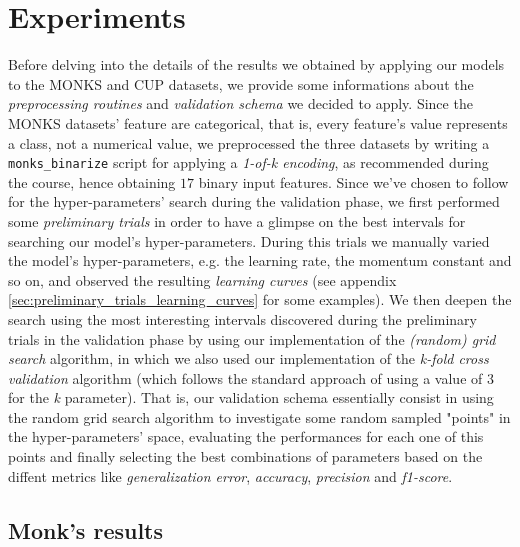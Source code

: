 \documentclass[11pt,twoside]{article}
\begin{document}
\section{Experiments} %
\label{sec:experiments}
    Before delving into the details of the results we obtained by applying our models to the MONKS and CUP
    datasets, we provide some informations about the \textit{preprocessing routines} and
    \textit{validation schema} we decided to apply. Since the MONKS datasets' feature are categorical, that is,
    every feature's value represents a class, not a numerical value, we preprocessed the three datasets by
    writing a \texttt{monks\_binarize} script for applying a \textit{1-of-k encoding}, as recommended during
    the course, hence obtaining $17$ binary input features. Since we've
    chosen to follow \cite{random_search} for the hyper-parameters' search during the validation phase, we first
    performed some \textit{preliminary trials} in order to have a glimpse on the best intervals for searching
    our model's hyper-parameters. During this trials we manually varied the model's hyper-parameters, e.g. the
    learning rate, the momentum constant and so on, and observed the resulting \textit{learning curves}
    (see appendix \ref{sec:preliminary_trials_learning_curves} for some examples).
    We then deepen the search using the most interesting intervals discovered during the preliminary trials
    in the validation phase by using our implementation of the \textit{(random) grid search} algorithm, in
    which we also used our implementation of the \textit{k-fold cross validation} algorithm (which follows
    the standard approach of using a value of $3$ for the \textit{k} parameter). That is, our validation schema
    essentially consist in using the random grid search algorithm to investigate some random sampled "points"
    in the hyper-parameters' space, evaluating the performances for each one of this points and finally
    selecting the best combinations of parameters based on the diffent metrics like \textit{generalization
    error}, \textit{accuracy}, \textit{precision} and \textit{f1-score}.

    \subsection{Monk's results} %
    \label{sub:monk_s_results}
\end{document}
